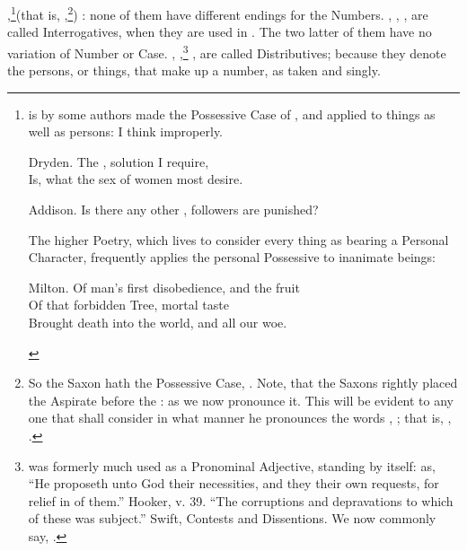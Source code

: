 ,\footnote{ is by some authors made the Possessive
  Case of , and applied to things as well as persons: I think
  improperly.

  \begin{aquote}{Dryden.}
    The ,  solution I require,\\
    Is, what the sex of women most desire.\\
  \end{aquote}

  \begin{aquote}{Addison.}
    Is there any other ,  followers are punished?
  \end{aquote}

  The higher Poetry, which lives to consider every thing as bearing a
  Personal Character, frequently applies the personal Possessive
   to inanimate beings:

  \begin{aquote}{Milton.}
    Of man's first disobedience, and the fruit\\
    Of that forbidden Tree,  mortal taste\\
    Brought death into the world, and all our woe.
  \end{aquote}}(that is, ,\footnote{So the Saxon  hath
  the Possessive Case, . Note, that the Saxons rightly
  placed the Aspirate before the : as we now pronounce it. This
  will be evident to any one that shall consider in what manner he
  pronounces the words , ; that is, ,
  .}) : none of them have different endings for the
Numbers. , , , are called Interrogatives,
when they are used in . The two latter of them have
no variation of Number or Case. ,
,\footnote{ was formerly much used as a Pronominal
  Adjective, standing by itself: as, ``He proposeth unto God their
  necessities, and they their own requests, for relief in  of
  them.'' Hooker, v. 39. ``The corruptions and depravations to which
   of these was subject.'' Swift, Contests and Dissentions. We
  now commonly say, .} , are called
Distributives; because they denote the persons, or things, that make up
a number, as taken  and singly.

